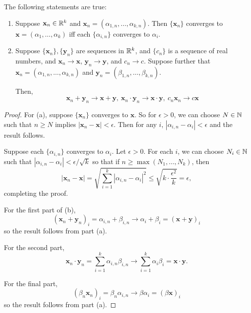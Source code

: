 \begin{theorem} %
The following statements are true:
\begin{enumerate}
\item Suppose $\textbf{x}_n \in \mathbb{R}^k$ and $\textbf{x}_n = (\alpha_{1,n}, \dotsc, \alpha_{k,n})$. Then $\{\textbf{x}_n\}$ converges to $\textbf{x} = (\alpha_1, \dotsc, \alpha_k)$ iff each $\{\alpha_{i,n}\}$ converges to $\alpha_i$.

\item Suppose $\{\textbf{x}_n\}, \{\textbf{y}_n\}$ are sequences in $\mathbb{R}^k$, and $\{c_n\}$ is a sequence of real numbers, and $\textbf{x}_n \to \textbf{x}$, $\textbf{y}_n \to \textbf{y}$, and $c_n \to c$. Suppose further that $\textbf{x}_n = (\alpha_{1,n}, \dotsc, \alpha_{k,n})$ and $\textbf{y}_n = (\beta_{1,n}, \dotsc, \beta_{k,n})$. 

Then,
\[
	\textbf{x}_n + \textbf{y}_n \to \textbf{x} + \textbf{y},\ \textbf{x}_n \cdot \textbf{y}_n \to \textbf{x} \cdot \textbf{y},\ c_n\textbf{x}_n \to c \textbf{x}
\] 
\end{enumerate}
\begin{proof}
For (a), suppose $\{\textbf{x}_n\}$ converges to $\textbf{x}$. So for $\epsilon > 0$, we can choose $N \in \mathbb{N}$ such that $n \ge N$ implies $|\textbf{x}_n - \textbf{x}| < \epsilon$. Then for any $i$, $|\alpha_{i,n} - \alpha_i| < \epsilon$ and the result follows.

Suppose each $\{\alpha_{i,n}\}$ converges to $\alpha_i$. Let $\epsilon > 0$. For each $i$, we can choose $N_i \in \mathbb{N}$ such that $|\alpha_{i,n} - \alpha_i| < \epsilon/\sqrt{k}$ so that if $n \ge \max(N_1, \dotsc, N_k)$, then
\[
	|\textbf{x}_n - \textbf{x}| = \sqrt{\sum_{i=1}^{k} |\alpha_{i,n} - \alpha_i|^2} \le \sqrt{k \cdot \frac{\epsilon^2}{k}} = \epsilon,
\]
completing the proof.

For the first part of (b), 
\[
	(\textbf{x}_n + \textbf{y}_n)_{i} = \alpha_{i,n} + \beta_{i,n} \to \alpha_i + \beta_i = (\textbf{x} + \textbf{y})_i
\]
so the result follows from part (a).

For the second part, 
\[
	\textbf{x}_n \cdot \textbf{y}_n = \sum_{i=1}^{k} \alpha_{i,n} \beta_{i,n} \to \sum_{i=1}^{k} \alpha_i \beta_i = \textbf{x} \cdot \textbf{y}.
\]

For the final part,
\[
	(\beta_n \textbf{x}_n)_i = \beta_n \alpha_{i,n} \to \beta \alpha_i = (\beta \textbf{x})_i
\]
so the result follows from part (a).
\end{proof}
\end{theorem}


